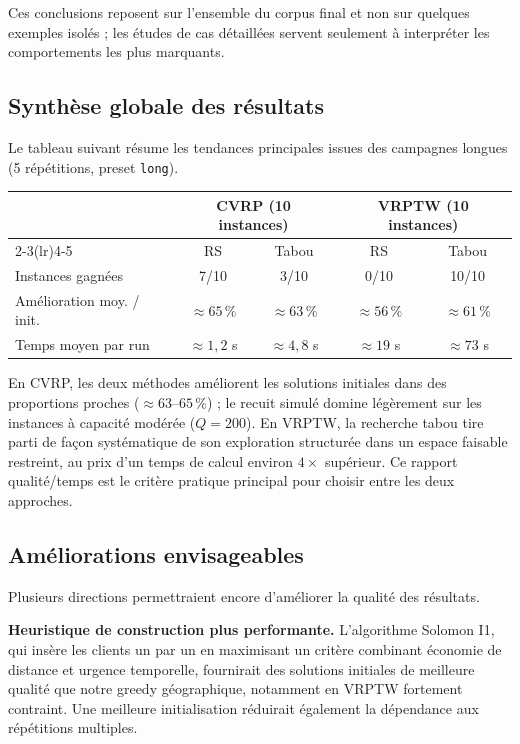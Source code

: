 \documentclass[11pt,a4paper]{article}
\begin{document}
Ces conclusions reposent sur l'ensemble du corpus final et non sur quelques exemples isolés ; les études de cas détaillées servent seulement à interpréter les comportements les plus marquants.

\subsection{Synthèse globale des résultats}

Le tableau suivant résume les tendances principales issues des campagnes longues (5 répétitions, preset \texttt{long}).

\begin{center}
\begin{tabular}{lcccc}
\toprule
 & \multicolumn{2}{c}{CVRP (10 instances)} & \multicolumn{2}{c}{VRPTW (10 instances)} \\
\cmidrule(lr){2-3}\cmidrule(lr){4-5}
 & RS & Tabou & RS & Tabou \\
\midrule
Instances gagnées & 7/10 & 3/10 & 0/10 & 10/10 \\
Amélioration moy. / init. & ${\approx}65\,\%$ & ${\approx}63\,\%$ & ${\approx}56\,\%$ & ${\approx}61\,\%$ \\
Temps moyen par run & ${\approx}1{,}2$ s & ${\approx}4{,}8$ s & ${\approx}19$ s & ${\approx}73$ s \\
\bottomrule
\end{tabular}
\end{center}

En CVRP, les deux méthodes améliorent les solutions initiales dans des proportions proches ($\approx63$--$65\,\%$) ; le recuit simulé domine légèrement sur les instances à capacité modérée ($Q=200$). En VRPTW, la recherche tabou tire parti de façon systématique de son exploration structurée dans un espace faisable restreint, au prix d'un temps de calcul environ $4\times$ supérieur. Ce rapport qualité/temps est le critère pratique principal pour choisir entre les deux approches.

\subsection{Améliorations envisageables}

Plusieurs directions permettraient encore d'améliorer la qualité des résultats.

\textbf{Heuristique de construction plus performante.} L'algorithme Solomon I1, qui insère les clients un par un en maximisant un critère combinant économie de distance et urgence temporelle, fournirait des solutions initiales de meilleure qualité que notre greedy géographique, notamment en VRPTW fortement contraint. Une meilleure initialisation réduirait également la dépendance aux répétitions multiples.
\end{document}
